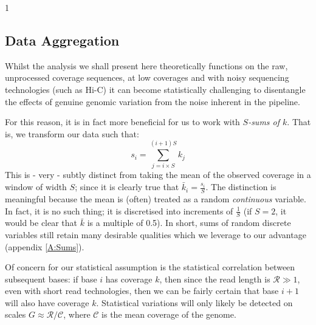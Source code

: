 \documentclass[fleqn,usenatbib]{mnras}
\def\commentVisible{1}
\newcommand\comment[1]
{
	{
		\if\commentVisible1
			\color{red!70!black}
		\else
			\color{black}
		\fi

		#1
	}
}
\begin{document}
		\comment{
		\subsection{Data Aggregation}

			Whilst the analysis we shall present here theoretically functions on the raw, unprocessed coverage sequences, at low coverages and with noisy sequencing technologies (such as Hi-C) it can become statistically challenging to disentangle the effects of genuine genomic variation from the noise inherent in the pipeline. 

			For this reason, it is in fact more beneficial for us to work with \textit{$S$-sums of $k$}. That is, we transform our data such that:
			\begin{equation}
				s_i = \sum_{j=i \times S}^{(i+1)S} k_{j}
			\end{equation}
			This is - very - subtly distinct from taking the mean of the observed coverage in a window of width $S$; since it is clearly true that $\bar{k}_i = \frac{s_i}{S}$. The distinction is meaningful because the mean is (often) treated as a random \textit{continuous} variable. In fact, it is no such thing; it is discretised into increments of $\frac{1}{S}$ (if $S = 2$, it would be clear that $\bar{k}$ is a multiple of 0.5). In short, sums of random discrete variables still retain many desirable qualities which we leverage to our advantage (appendix \ref{A:Sums}).

			Of concern for our statistical assumption is the statistical correlation between subsequent bases: if base $i$ has coverage $k$, then since the read length is $\mathcal{R}\gg 1$, even with short read technologies, then we can be fairly certain that base $i+1$ will also have coverage $k$. Statistical variations will only likely be detected on scales $G \approx \mathcal{R}/\mathcal{C}$, where $\mathcal{C}$ is the mean coverage of the genome. 

}
\end{document}
